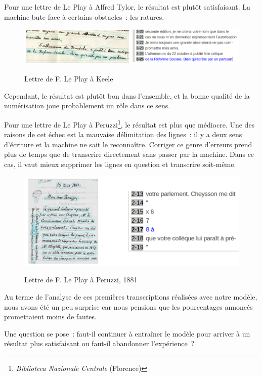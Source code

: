 Pour une lettre de Le Play à Alfred Tylor, le résultat est plutôt satisfaisant. La machine bute face à certains obstacles : les ratures. 

 \begin{figure}[ht]
    \centering
    \caption{Lettre de F. Le Play à Keele}
    \includegraphics[width=16cm]{images/keele.png}
    \label{keele}
\end{figure}

Cependant, le résultat est plutôt bon dans l’ensemble, et la bonne qualité de la numérisation joue probablement un rôle dans ce sens. 

Pour une lettre de Le Play à Peruzzi\footnote{\emph{Biblioteca Nazionale Centrale} (Florence)
}, le résultat est plus que médiocre. Une des raisons de cet échec est la mauvaise délimitation des lignes : il y a deux sens d'écriture et la machine ne sait le reconnaître. Corriger ce genre d’erreurs prend plus de temps que de transcrire directement sans passer par la machine. Dans ce cas, il vaut mieux supprimer les lignes en question et transcrire soit-même. 

 \begin{figure}[ht]
    \centering
    \caption{Lettre de F. Le Play à Peruzzi, 1881}
    \includegraphics[width=16cm]{images/lpPeruzzi.png}
    \label{lpPeruzzi}
\end{figure}

Au terme de l'analyse de ces premières transcriptions réalisées avec notre modèle, nous avons été un peu surprise car nous pensions que les pourcentages annoncés promettaient moins de fautes.
 
Une question se pose : faut-il continuer à entraîner le modèle pour arriver à un résultat plus satisfaisant ou faut-il abandonner l’expérience ?

